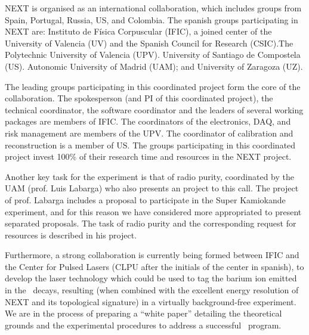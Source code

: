 NEXT is organised as an international collaboration, which includes groups from Spain, Portugal, Russia, US, and Colombia. The spanish groups participating in NEXT are: Instituto de Física Corpuscular (IFIC), a joined center of the University of Valencia (UV) and the Spanish Council for Research (CSIC).The  Polytechnic University of Valencia (UPV). University of Santiago de Compostela (US). Autonomic University of Madrid (UAM); and University of Zaragoza (UZ). 

The leading groups participating in this coordinated project form the core of the collaboration. The spokesperson (and PI of this coordinated project), the technical coordinator, the software coordinator and the leaders of several working  packages are members of IFIC. The coordinators of the electronics, DAQ, and risk management are members of the UPV. The coordinator of calibration and reconstruction is a member of US. The groups participating in this coordinated project invest 100\% of their research time and resources in the NEXT project. 

Another key task for the experiment is that of radio purity, coordinated by the UAM (prof. Luis Labarga) who also presents an project to this call. The project of prof. Labarga includes a proposal to participate in the Super Kamiokande experiment, and for this reason we have considered more appropriated to present separated proposals. The task of radio purity and the corresponding request for resources is described in his project.


Furthermore, a strong collaboration is currently being formed between IFIC and the Center for Pulsed Lasers (CLPU after the initials of the center in spanish), to develop the laser technology which could be used to tag the barium ion emitted in the \bb\ decays, resulting (when combined with the excellent energy resolution of NEXT and its topological signature) in a virtually background-free experiment. We are in the process of preparing a ``white paper'' detailing the theoretical grounds and the experimental procedures to address a successful  \BATA\ program. 
